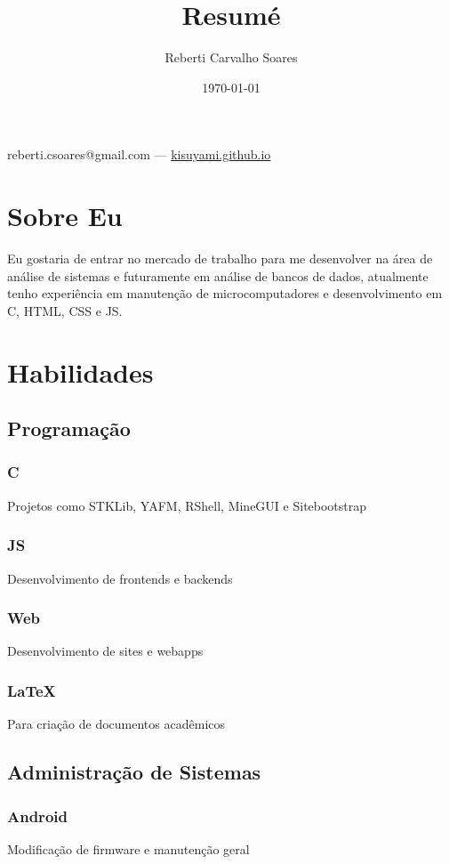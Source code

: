\documentclass[11pt]{article}
\author{Reberti Carvalho Soares}
\date{\today}
\title{Resumé}
\begin{document}
\begin{center}
  {\huge\bfseries
    \theauthor}

    \vspace{.25em}
    reberti.csoares@gmail.com --- \url{kisuyami.github.io}

\end{center}

\section{Sobre Eu}
\label{sec:orgdbe8442}
Eu gostaria de entrar no mercado de trabalho para me desenvolver na área
de análise de sistemas e futuramente em análise de bancos de dados,
atualmente tenho experiência em manutenção de microcomputadores e
desenvolvimento em C, HTML, CSS e JS.

\section{Habilidades}
\label{sec:org819a336}
\subsection{Programação}
\label{sec:org42543c9}
\subsubsection{C}
\label{sec:org46ade7f}
Projetos como STKLib, YAFM, RShell, MineGUI e Sitebootstrap
\subsubsection{JS}
\label{sec:orgd39dd5f}
Desenvolvimento de frontends e backends
\subsubsection{Web}
\label{sec:orgc24c33e}
Desenvolvimento de sites e webapps
\subsubsection{\LaTeX{}}
\label{sec:org33908cf}
Para criação de documentos acadêmicos

\subsection{Administração de Sistemas}
\label{sec:orgfcec08e}
\subsubsection{Android}
\label{sec:orgdeb6ce4}
Modificação de firmware e manutenção geral
\end{document}
